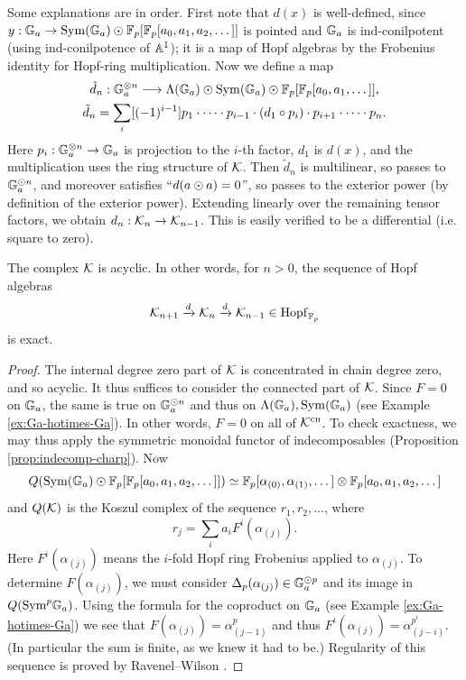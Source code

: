 \begin{remark} \label{rmk:build-complex}
Some explanations are in order.
First note that $d(x)$ is well-defined, since $y: {\mathbb G}_a \to \mathrm{Sym}({\mathbb G}_a) \odot \mathbb{F}_p[\mathbb{F}_p[a_0, a_1, a_2, \dots]]$ is pointed and ${\mathbb G}_a$ is ind-conilpotent (using ind-conilpotence of $\mathbb A^1$); it is a map of Hopf algebras by the Frobenius identity for Hopf-ring multiplication.
Now we define a map
\begin{gather*}
\tilde d_n: {\mathbb G}_a^{\otimes n} \longrightarrow
\Lambda({\mathbb G}_a) \odot \mathrm{Sym}({\mathbb G}_a) \odot \mathbb{F}_p[\mathbb{F}_p[a_0,a_1,\dots]],\\
\tilde d_n = \sum_i [(-1)^{i-1}]
 p_1\cdot\dots\cdot p_{i-1}\cdot (d_1\circ p_i)
 \cdot p_{i+1}\cdot\dots\cdot p_n.
\end{gather*}
Here $p_i: {\mathbb G}_a^{\otimes n} \to {\mathbb G}_a$ is projection to the $i$-th factor, $d_1$ is $d(x)$, and the multiplication uses the ring structure of $\mathcal K$.
Then $\tilde d_n$ is multilinear, so passes to ${\mathbb G}_a^{\odot n}$, and moreover satisfies ``$d(a \odot a) = 0$'', so passes to the exterior power (by definition of the exterior power).
Extending linearly over the remaining tensor factors, we obtain $d_n: \mathcal K_n \to \mathcal K_{n-1}$.
This is easily verified to be a differential (i.e. square to zero).
\end{remark}

\begin{lemma} \label{lemm:regular-sequence}
The complex $\mathcal K$ is acyclic.
In other words, for $n > 0$, the sequence of Hopf algebras \[ \mathcal K_{n+1} \xrightarrow{d} \mathcal K_n \xrightarrow{d} \mathcal K_{n-1} \in \mathrm{Hopf}_{\mathbb{F}_p} \] is exact.
\end{lemma}
\begin{proof}
The internal degree zero part of $\mathcal K$ is concentrated in chain degree zero, and so acyclic.
It thus suffices to consider the connected part of $\mathcal K$.
Since $F=0$ on ${\mathbb G}_a$, the same is true on ${\mathbb G}_a^{\odot n}$ and thus on $\Lambda({\mathbb G}_a), \mathrm{Sym}({\mathbb G}_a)$ (see Example \ref{ex:Ga-hotimes-Ga}).
In other words, $F=0$ on all of $\mathcal K^{\mathrm{cn}}$.
To check exactness, we may thus apply the symmetric monoidal functor of indecomposables (Proposition \ref{prop:indecomp-charp}).
Now \[ Q(\mathrm{Sym}({\mathbb G}_a) \odot \mathbb{F}_p[\mathbb{F}_p[a_0, a_1, a_2, \dots]]) \simeq \mathbb{F}_p[\alpha_{(0)}, \alpha_{(1)}, \dots] \otimes \mathbb{F}_p[a_0, a_1, a_2, \dots] \] and $Q(\mathcal K)$ is the Koszul complex of the sequence $r_1, r_2, \dots$, where \[ r_j = \sum_{i} a_i F^i(\alpha_{(j)}). \]
Here $F^i(\alpha_{(j)})$ means the $i$-fold Hopf ring Frobenius applied to $\alpha_{(j)}$.
To determine $F(\alpha_{(j)})$, we must consider $\Delta_p(\alpha_{(j)}) \in {\mathbb G}_a^{\odot p}$ and its image in $Q(\mathrm{Sym}^p {\mathbb G}_a)$.
Using the formula for the coproduct on ${\mathbb G}_a$ (see Example \ref{ex:Ga-hotimes-Ga}) we see that $F(\alpha_{(j)})=\alpha_{(j-1)}^p$ and thus $F^i(\alpha_{(j)}) = \alpha_{(j-i)}^{p^i}$.
(In particular the sum is finite, as we knew it had to be.)
Regularity of this sequence is proved by Ravenel--Wilson \cite[Lemma 4.15(b)]{ravenel-wilson}.
\end{proof}

